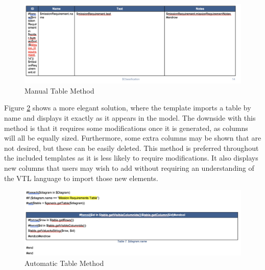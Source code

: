 \begin{figure}[H]
    \centering
    \includegraphics[width=\textwidth]{Thesis/Analysis_and_Results/Analysis and Results Figures/MR table method 1.png}
    \caption{Manual Table Method}
    \label{fig:Table Method 1}
\end{figure}

Figure \ref{fig:Table Method 2} shows a more elegant solution, where the template imports a table by name and displays it exactly as it appears in the model. The downside with this method is that it requires some modifications once it is generated, as columns will all be equally sized. Furthermore, some extra columns may be shown that are not desired, but these can be easily deleted. This method is preferred throughout the included templates as it is less likely to require modifications. It also displays new columns that users may wish to add without requiring an understanding of the VTL language to import those new elements.

\begin{figure}[H]
    \centering
    \includegraphics[width=\textwidth]{Thesis/Analysis_and_Results/Analysis and Results Figures/MR table method 2.png}
    \caption{Automatic Table Method}
    \label{fig:Table Method 2}
\end{figure}